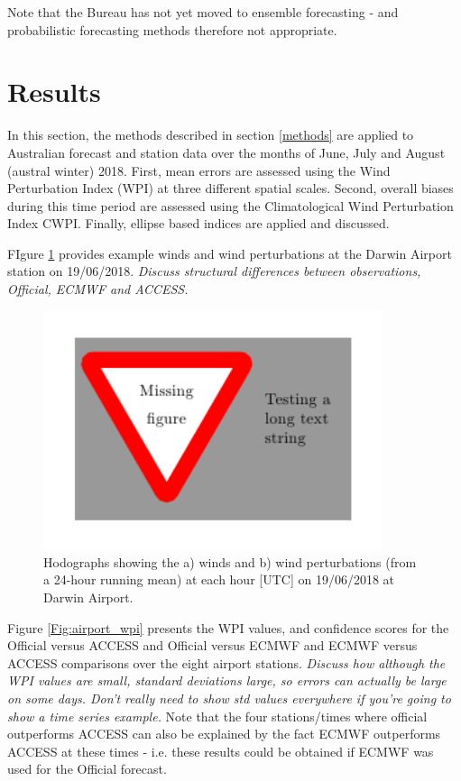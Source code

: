 \documentclass[alpha-refs]{wiley-article}
\begin{document}
Note that the Bureau has not yet moved to ensemble forecasting - and probabilistic forecasting methods therefore not appropriate. 

\section{Results}
\label{results}
In this section, the methods described in section \ref{methods} are applied to Australian forecast and station data over the months of June, July and August (austral winter) 2018. First, mean errors are assessed using the Wind Perturbation Index (WPI) at three different spatial scales. Second, overall biases during this time period are assessed using the Climatological Wind Perturbation Index CWPI. Finally, ellipse based indices are applied and discussed.

FIgure \ref{Fig:darwin_airport_winds} provides example winds and wind perturbations at the Darwin Airport station on 19/06/2018. \textit{Discuss structural differences between observations, Official, ECMWF and ACCESS.} 

\begin{figure}
\centering
\includegraphics[keepaspectratio=true, height=7cm]{figure_placeholder.png}
\caption{Hodographs showing the a) winds and b) wind perturbations (from a 24-hour running mean) at each hour [UTC] on 19/06/2018 at Darwin Airport.}
\label{Fig:darwin_airport_winds}
\end{figure}

Figure \ref{Fig:airport_wpi} presents the WPI values, and confidence scores for the Official versus ACCESS and Official versus ECMWF and ECMWF versus ACCESS comparisons over the eight airport stations. \textit{Discuss how although the WPI values are small, standard deviations large, so errors can actually be large on some days. Don't really need to show std values everywhere if you're going to show a time series example.} Note that the four stations/times where official outperforms ACCESS can also be explained by the fact ECMWF outperforms ACCESS at these times - i.e. these results could be obtained if ECMWF was used for the Official forecast.
\end{document}
